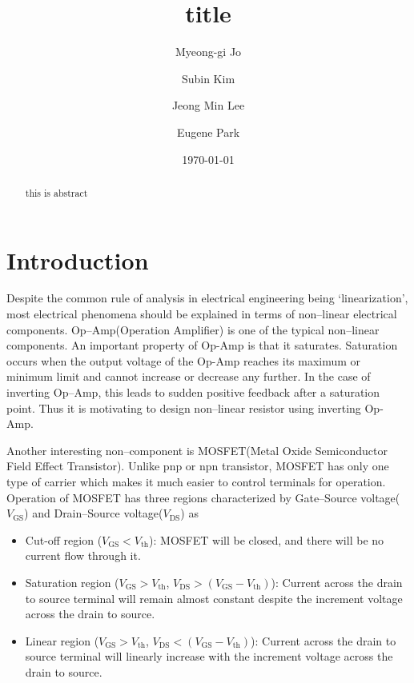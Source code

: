 \documentclass[%
 aip,
amsmath,amssymb,
reprint,
]{revtex4-1}
\begin{document}

\title[Intermediate Physics Laboratory 2, Module 2]{title}
\author{Myeong-gi Jo}
\author{Subin Kim}
\author{Jeong Min Lee}
\author{Eugene Park}

\date{\today}
\begin{abstract}
this is abstract
\end{abstract}

\maketitle

\section{\label{sec:Intro} Introduction} 

Despite the common rule of analysis in electrical engineering being `linearization', most electrical phenomena should be explained in terms of non--linear electrical components. Op--Amp(Operation Amplifier) is one of the typical non--linear components. An important property of Op-Amp is that it saturates. Saturation occurs when the output voltage of the Op-Amp reaches its maximum or minimum limit and cannot increase or decrease any further. In the case of inverting Op--Amp, this leads to sudden positive feedback after a saturation point. Thus it is motivating to design non--linear resistor using inverting Op-Amp.

Another interesting non--component is MOSFET(Metal Oxide Semiconductor Field Effect Transistor). Unlike pnp or npn transistor, MOSFET has only one type of carrier which makes it much easier to control terminals for operation. Operation of MOSFET has three regions characterized by Gate--Source voltage($V_{\textrm{GS}}$) and Drain--Source voltage($V_{\textrm{DS}}$) as

\begin{itemize}
    \item Cut-off region ($V_{\textrm{GS}}<V_{\textrm{th}}$): MOSFET will be closed, and there will be no current flow through it. 
    \item Saturation region ($V_{\textrm{GS}}>V_{\textrm{th}}$, $V_{\textrm{DS}}>(V_{\textrm{GS}}-V_{\textrm{th}})$): Current across the drain to source terminal will remain almost constant despite the increment voltage across the drain to source.
    \item Linear region ($V_{\textrm{GS}}>V_{\textrm{th}}$, $V_{\textrm{DS}}<(V_{\textrm{GS}}-V_{\textrm{th}})$): Current across the drain to source terminal will linearly increase with the increment voltage across the drain to source.
\end{itemize}
\end{document}
